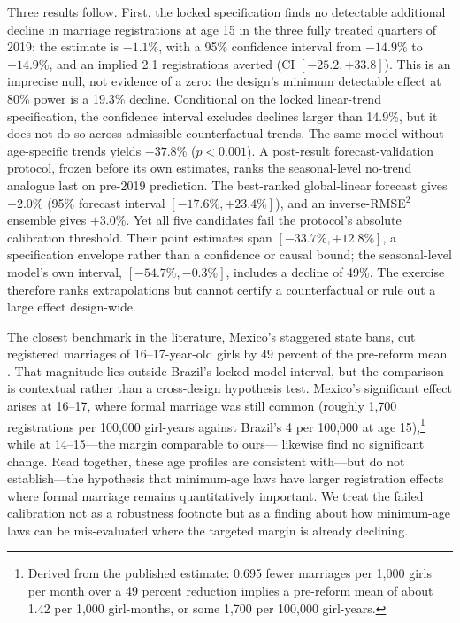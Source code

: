 \documentclass[12pt]{article}
\begin{document}
Three results follow. First, the locked specification finds no detectable additional
decline in marriage registrations at age 15 in the three fully treated quarters of 2019:
the estimate is $-1.1\%$, with a 95\% confidence interval from $-14.9\%$ to $+14.9\%$,
and an implied 2.1 registrations averted (CI $[-25.2, +33.8]$). This is an imprecise
null, not evidence of a zero: the design's minimum detectable effect at 80\% power is a
19.3\% decline. Conditional on the locked linear-trend specification, the confidence
interval excludes declines larger than 14.9\%, but it does not do so across admissible
counterfactual trends. The same model without age-specific trends yields $-37.8\%$
($p<0.001$). A post-result forecast-validation protocol, frozen before its own
estimates, ranks the seasonal-level no-trend analogue last on pre-2019 prediction. The
best-ranked global-linear forecast gives $+2.0\%$ (95\% forecast interval
$[-17.6\%, +23.4\%]$), and an inverse-RMSE$^2$ ensemble gives $+3.0\%$. Yet all five
candidates fail the protocol's absolute calibration threshold. Their point estimates
span $[-33.7\%, +12.8\%]$, a specification envelope rather than a confidence or causal
bound; the seasonal-level model's own interval, $[-54.7\%, -0.3\%]$, includes a
decline of 49\%. The exercise therefore ranks extrapolations but cannot certify a
counterfactual or rule out a large effect design-wide.

The closest benchmark in the literature, Mexico's staggered state bans, cut registered
marriages of 16--17-year-old girls by 49 percent of the pre-reform mean
\citep{BellesObreroLombardi2023}. That magnitude lies outside Brazil's locked-model
interval, but the comparison is contextual rather than a cross-design hypothesis test.
Mexico's significant effect arises at 16--17, where formal marriage was still common
(roughly 1,700 registrations per 100,000 girl-years against Brazil's 4 per 100,000 at
age 15),\footnote{Derived from the published estimate: 0.695 fewer marriages per 1,000
girls per month over a 49 percent reduction implies a pre-reform mean of about 1.42 per
1,000 girl-months, or some 1,700 per 100,000 girl-years.} while at 14--15---the margin
comparable to ours---\citet{BellesObreroLombardi2023} likewise find no significant
change. Read together, these age profiles are consistent with---but do not
establish---the hypothesis that minimum-age laws have larger registration effects where
formal marriage remains quantitatively important. We treat the failed calibration not
as a robustness footnote but as a finding about how minimum-age laws can be
mis-evaluated where the targeted margin is already declining.
\end{document}
